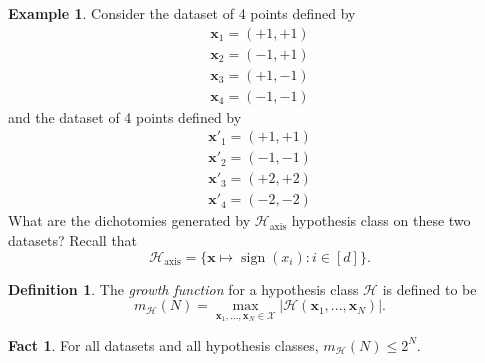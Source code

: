 \documentclass[10pt]{exam}
\theoremstyle{definition}
\newtheorem{problem}{Problem}
\newtheorem{example}{Example}
\newtheorem{defn}{Definition}
\newtheorem{fact}{Fact}
\DeclareMathOperator{\sign}{sign}
\newcommand{\x}{\mathbf x}
\newcommand{\mH}{m_{\mathcal H}}
\newcommand{\HH}[1]{\mathcal H_{\text{#1}}}
\begin{document}
\begin{example}
    Consider the dataset of 4 points defined by
    \begin{align*}
    \x_1 = (+1,+1) \\
    \x_2 = (-1,+1) \\
    \x_3 = (+1,-1) \\
    \x_4 = (-1,-1)
    \end{align*}
    and the dataset of 4 points defined by
    \begin{align*}
    \x'_1 = (+1,+1) \\
    \x'_2 = (-1,-1) \\
    \x'_3 = (+2,+2) \\
    \x'_4 = (-2,-2)
    \end{align*}
    What are the dichotomies generated by $\HH{axis}$ hypothesis class on these two datasets?
    Recall that
    \begin{equation*}
    \HH{axis} = \bigg\{ \x \mapsto \sign(x_i) : i \in [d] \bigg\}.
    \end{equation*}
\end{example}



\newpage
\begin{defn}
    The \emph{growth function} for a hypothesis class $\mathcal H$ is defined to be
    \begin{equation}
        m_{\mathcal H}(N) = \max_{\x_1,...,\x_N\in\mathcal X} \big| \mathcal H(\x_1, ..., \x_N) \big|.
    \end{equation}
\end{defn}
\begin{fact}
    For all datasets and all hypothesis classes,
        $
        \mH(N) \le 2^N.
        $
\end{fact}
\end{document}
